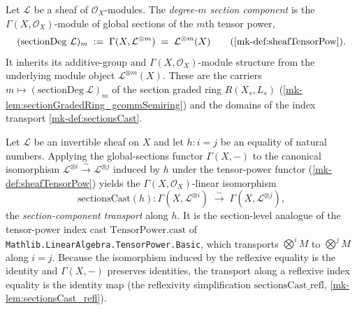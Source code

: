 \begin{definition}\label{mk-def:sectionDeg}
  \leanok

  Let \(\mathcal{L}\) be a sheaf of \(\mathcal{O}_X\)-modules. The
  \emph{degree-\(m\) section component} is the \(\Gamma(X,\mathcal{O}_X)\)-module of
  global sections of the \(m\)th tensor power,
  \[
    (\mathrm{sectionDeg}\ \mathcal{L})_m
      \;:=\; \Gamma(X, \mathcal{L}^{\otimes m})
      \;=\; \mathcal{L}^{\otimes m}(X)
        \qquad(\ref{mk-def:sheafTensorPow}).
  \]
  It inherits its additive-group and \(\Gamma(X,\mathcal{O}_X)\)-module structure
  from the underlying module object \(\mathcal{L}^{\otimes m}(X)\). These are the
  carriers \(m \mapsto (\mathrm{sectionDeg}\ \mathcal{L})_m\) of the section graded
  ring \(R(X_s, L_s)\) (\ref{mk-lem:sectionGradedRing_gcommSemiring}) and the
  domains of the index transport \ref{mk-def:sectionsCast}.
\end{definition}

\begin{definition}\label{mk-def:sectionsCast}
  \leanok

  Let \(\mathcal{L}\) be an invertible sheaf on \(X\) and let \(h : i = j\) be an
  equality of natural numbers. Applying the global-sections functor
  \(\Gamma(X,-)\) to the canonical isomorphism
  \(\mathcal{L}^{\otimes i} \xrightarrow{\sim} \mathcal{L}^{\otimes j}\) induced by
  \(h\) under the tensor-power functor (\ref{mk-def:sheafTensorPow}) yields the
  \(\Gamma(X,\mathcal{O}_X)\)-linear isomorphism
  \[
    \mathrm{sectionsCast}(h) :
    \Gamma(X, \mathcal{L}^{\otimes i}) \;\xrightarrow{\ \sim\ }\;
    \Gamma(X, \mathcal{L}^{\otimes j}),
  \]
  the \emph{section-component transport} along \(h\). It is the section-level
  analogue of the tensor-power index cast \(\mathrm{TensorPower.cast}\) of
  \texttt{Mathlib.LinearAlgebra.TensorPower.Basic}, which transports
  \(\bigotimes^{i} M\) to \(\bigotimes^{j} M\) along \(i = j\). Because the
  isomorphism induced by the reflexive equality is the identity and
  \(\Gamma(X,-)\) preserves identities, the transport along a reflexive index
  equality is the identity map (the reflexivity simplification
  \(\mathrm{sectionsCast\_refl}\), \ref{mk-lem:sectionsCast_refl}).
\end{definition}

